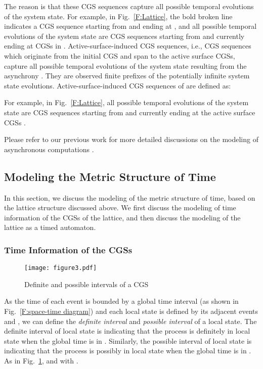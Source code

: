 \documentclass[10pt,conference,compsocconf,letterpaper]{IEEEtran}
\begin{document}
\noindent The reason is that these CGS sequences capture all possible temporal evolutions of the system state. For example, in Fig.~\ref{F:Lattice}, the bold broken line indicates a CGS sequence starting from  and ending at , and all possible temporal evolutions of the system state are CGS sequences starting from  and currently ending at CGSs in .
\fi
Active-surface-induced CGS sequences, i.e., CGS sequences which originate from the initial CGS and
span to the active surface CGSs, capture all possible temporal evolutions of the system state resulting from the asynchrony \cite{Yang13}. They are observed finite prefixes of the potentially infinite system state evolutions. Active-surface-induced CGS sequences of  are defined as:

For example, in Fig.~\ref{F:Lattice}, all possible temporal evolutions of the system state are CGS sequences starting from  and currently ending at the active surface CGSs .

Please refer to our previous work for more detailed discussions on the modeling of asynchronous computations \cite{Yang13, Huang12, Wei12, Yang14}.

\subsection{Modeling the Metric Structure of Time}

In this section, we discuss the modeling of the metric structure of time, based on the lattice structure discussed above. We first discuss the modeling of time information of the CGSs of the lattice, and then discuss the modeling of the lattice as a timed automaton.

\subsubsection{Time Information of the CGSs}
\begin{figure}[tbp]
\begin{center}
  \texttt{[image: figure3.pdf]}
  \caption{Definite and possible intervals of a CGS}
  \label{F:di and pi}
\end{center}
\end{figure}

As the time of each event  is bounded by a global time interval  (as shown in Fig.~\ref{F:space-time diagram}) and each local state  is defined by its adjacent events  and , we can define the \textit{definite interval} and \textit{possible interval} of a local state. The definite interval  of local state  is 
indicating that the process is definitely in local state  when the global time is in . Similarly, the possible interval  of local state  is 
indicating that the process is possibly in local state  when the global time is in . As in Fig.~\ref{F:di and pi},  and  with .
\end{document}
